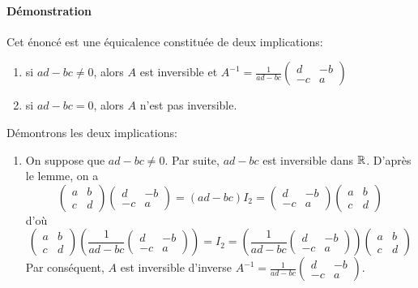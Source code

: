 \paragraph{Démonstration} Cet énoncé est une équicalence constituée de deux implications:
\begin{enumerate}
  \item si $a d - b c \neq 0$, alors $A$ est inversible et $A^{-1} = \frac{1}{ad-bc} \begin{pmatrix} d & -b \\ -c & a \end{pmatrix}$
  
  \item si $a d - b c = 0$, alors $A$ n'est pas inversible.
\end{enumerate}
Démontrons les deux implications:
\begin{enumerate}
  \item On suppose que $a d - b c \neq 0$. Par suite, $a d - b c$ est inversible dans $\mathbb{R}$. D'après le lemme, on a
    $$\begin{pmatrix} a & b \\ c & d \end{pmatrix} \begin{pmatrix} d & -b \\ -c & a \end{pmatrix} 
      = (a d - b c) I_2 
      =  \begin{pmatrix} d & -b \\ -c & a \end{pmatrix} \begin{pmatrix} a & b \\ c & d \end{pmatrix}$$
    d'où
    $$\begin{pmatrix} a & b \\ c & d \end{pmatrix} \left( \frac{1}{a d - b c} \begin{pmatrix} d & -b \\ -c & a \end{pmatrix} \right) 
      = I_2 
      = \left( \frac{1}{a d - b c} \begin{pmatrix} d & -b \\ -c & a \end{pmatrix} \right) \begin{pmatrix} a & b \\ c & d \end{pmatrix}$$
    Par conséquent, $A$ est inversible d'inverse $A^{-1}=\frac{1}{a d - b c}\begin{pmatrix} d & -b \\ -c & a\end{pmatrix}$.
    

\end{enumerate}
